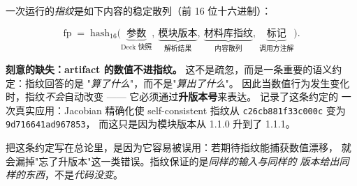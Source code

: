 一次运行的\emph{指纹}是如下内容的稳定散列（前 16 位十六进制）：

\begin{equation}
\text{fp} \;=\; \mathrm{hash}_{16}\bigl(
\underbrace{\text{参数}}_{\text{Deck 快照}},\
\underbrace{\text{模块版本}}_{\text{解析结果}},\
\underbrace{\text{材料库指纹}}_{\text{内容散列}},\
\underbrace{\text{标记}}_{\text{调用方注解}}\bigr).
\label{eq:arch-fingerprint}
\end{equation}

\textbf{刻意的缺失：artifact 的数值不进指纹。}
这不是疏忽，而是一条重要的语义约定：指纹回答的是
"\emph{算了什么}"，而不是"\emph{算出了什么}"。
因此当数值行为发生变化时，指纹\emph{不会}自动改变 ——
它必须通过\textbf{升版本号}来表达。 记录了这条约定的
一次真实应用：Jacobian 精确化使 self-consistent 指纹从
\texttt{c26cb881f33c000c} 变为 \texttt{9d716641ad967853}，
而这只是因为模块版本从 1.1.0 升到了 1.1.1。

把这条约定写在总论里，是因为它容易被误用：若期待指纹能捕获数值漂移，
就会漏掉"忘了升版本"这一类错误。指纹保证的是\emph{同样的输入与同样的
版本给出同样的东西}，不是\emph{代码没变}。

\cleardoublepage
